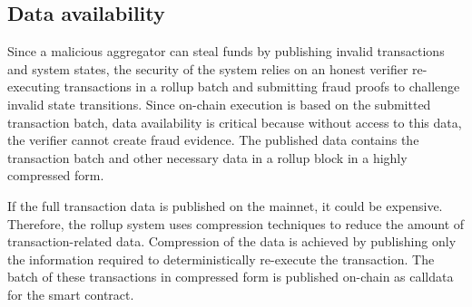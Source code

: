\documentclass{article}
\begin{document}
\subsection{Data availability}
Since a malicious aggregator can steal funds by publishing invalid transactions and system states, the security of the system relies on an honest verifier re-executing transactions in a rollup batch and submitting fraud proofs to challenge invalid state transitions. Since on-chain execution is based on the submitted transaction batch, data availability is critical because without access to this data, the verifier cannot create fraud evidence. The published data contains the transaction batch and other necessary data in a rollup block in a highly compressed form.

If the full transaction data is published on the mainnet, it could be expensive. Therefore, the rollup system uses compression techniques to reduce the amount of transaction-related data. Compression of the data is achieved by publishing only the information required to deterministically re-execute the transaction. The batch of these transactions in compressed form is published on-chain as calldata for the smart contract.


\end{document}
